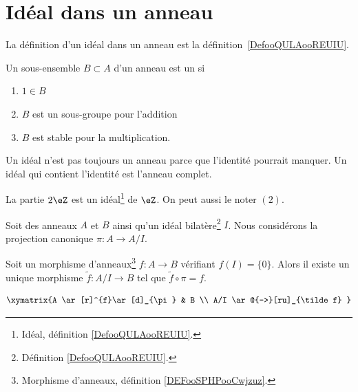 \section{Idéal dans un anneau}

La définition d'un idéal dans un anneau est la définition~\ref{DefooQULAooREUIU}.

\begin{definition}  \label{DefAJVTPxb}
	Un sous-ensemble \( B\subset A\) d'un anneau est un  si
	\begin{enumerate}
		\item
		      \( 1\in B\)
		\item
		      \( B\) est un sous-groupe pour l'addition
		\item
		      \( B\) est stable pour la multiplication.
	\end{enumerate}
\end{definition}

\begin{remark}
	Un idéal n'est pas toujours un anneau parce que l'identité pourrait manquer. Un idéal qui contient l'identité est l'anneau complet.
\end{remark}

\begin{lemma}       \label{LEMooQAYSooCYJXkC}
	La partie \( 2\eZ\) est un idéal\footnote{Idéal, définition \ref{DefooQULAooREUIU}.} de \( \eZ\). On peut aussi le noter \( (2) \).
\end{lemma}

\begin{proposition}	\label{PROPooPZGFooEbSBXD}
	Soit des anneaux \( A\) et \( B\) ainsi qu'un idéal bilatère\footnote{Définition \ref{DefooQULAooREUIU}.} \( I\). Nous considérons la projection canonique \(\pi \colon A\to A/I  \).

	Soit un morphisme d'anneaux\footnote{Morphisme d'anneaux, définition \ref{DEFooSPHPooCwjzuz}.} \(f \colon A\to B  \) vérifiant \( f(I)=\{ 0 \}\). Alors il existe un unique morphisme \(\tilde f \colon A/I\to B  \) tel que \( \tilde f\circ\pi=f\).

	\begin{equation}
		\xymatrix{%
			A \ar[r]^{f}\ar[d]_{\pi}       &   B                         \\
			A/I    \ar@{-->}[ru]_{\tilde f}
		}
	\end{equation}
\end{proposition}

